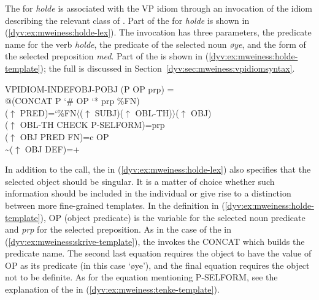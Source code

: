 \documentclass[output=paper]{langsci/langscibook}
\begin{document}
The  for \textit{holde} is associated with the VP idiom through an invocation of the idiom  describing the relevant class of .
Part of the  for \textit{holde} is shown in  (\ref{dyv:ex:mweiness:holde-lex}).
The  invocation has three parameters, the predicate name for the verb \textit{holde}, the predicate of the selected noun \textit{øye},  and the form of the selected preposition \textit{med}.
Part of the  is shown in  (\ref{dyv:ex:mweiness:holde-template}); the full  is discussed in Section~\ref{dyv:sec:mweiness:vpidiomsyntax}.


\ea\label{dyv:ex:mweiness:holde-template}
{\small 
 VPIDIOM-INDEFOBJ-POBJ (P OP prp) =\\
\hspace{1.5em} @(CONCAT P `\# OP `* prp \%FN)\\
\hspace{1.5em}  ($\uparrow$  PRED)=`\%FN$\langle$($\uparrow$ SUBJ)($\uparrow$ OBL-TH)$\rangle$($\uparrow$ OBJ)\\
\hspace{1.5em} ($\uparrow$ OBL-TH CHECK P-SELFORM)=prp\\
\hspace{1.5em} ($\uparrow$ OBJ PRED FN)=c OP\\
\hspace{1.5em} {\textasciitilde}($\uparrow$ OBJ DEF)=+
}
\z

In addition to the  call, the  in   (\ref{dyv:ex:mweiness:holde-lex}) also specifies that the selected object should be singular.
It is a matter of choice whether such information should be included in the individual  or give rise to a distinction between more fine-grained templates.
In the  definition in (\ref{dyv:ex:mweiness:holde-template}), OP (object predicate) is the variable for the selected noun predicate and \emph{prp} for the selected preposition.
As in the case of the  in (\ref{dyv:ex:mweiness:skrive-template}), the  invokes the CONCAT  which builds the predicate name.
The second last equation requires the object to have the value of OP as its predicate (in this case `øye'), and the final equation requires the object not to be definite.
As for the equation mentioning P-SELFORM, see the explanation of the  in (\ref{dyv:ex:mweiness:tenke-template}).
\end{document}
